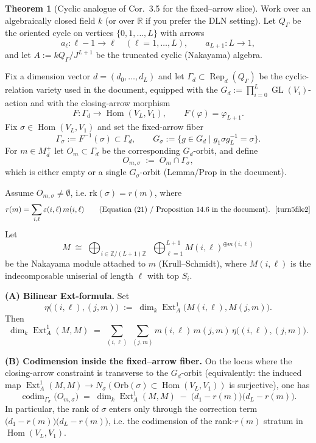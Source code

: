 \documentclass{article}
\newcommand{\Hom}{\operatorname{Hom}}
\newcommand{\Rep}{\operatorname{Rep}}
\newcommand{\codim}{\operatorname{codim}}
\newcommand{\Ext}{\operatorname{Ext}}
\newcommand{\GL}{\operatorname{GL}}
\theoremstyle{definition}
\newtheorem{theorem}{Theorem}[section]
\begin{document}
\begin{theorem}[Cyclic analogue of Cor.~3.5 for the fixed--arrow slice]\label{thm:cyclic_cor35}
Work over an algebraically closed field $k$ (or over $\mathbb{R}$ if you prefer the DLN setting).
Let $Q_\Gamma$ be the oriented cycle on vertices $\{0,1,\dots,L\}$ with arrows
\[
a_\ell:\ell-1\to \ell\quad (\ell=1,\dots,L),\qquad a_{L+1}:L\to 1,
\]
and let $A:=kQ_\Gamma/J^{L+1}$ be the truncated cyclic (Nakayama) algebra.

Fix a dimension vector $d=(d_0,\dots,d_L)$ and let $\Gamma_d\subset \Rep_d(Q_\Gamma)$ be the cyclic-relation variety
used in the document, equipped with the $G_d:=\prod_{i=0}^L\GL(V_i)$-action and with the closing-arrow morphism
\[
F:\Gamma_d\to \Hom(V_L,V_1),\qquad F(\varphi)=\varphi_{L+1}.
\]
Fix $\sigma\in\Hom(V_L,V_1)$ and set the fixed-arrow fiber
\[
\Gamma_\sigma:=F^{-1}(\sigma)\subset \Gamma_d,\qquad
G_\sigma:=\{g\in G_d\mid g_1\sigma g_L^{-1}=\sigma\}.
\]
For $m\in M_d^+$ let $O_m\subset \Gamma_d$ be the corresponding $G_d$-orbit, and define
\[
O_{m,\sigma}\;:=\;O_m\cap \Gamma_\sigma,
\]
which is either empty or a single $G_\sigma$-orbit (Lemma/Prop in the document). \ \ \textup{\cite{turn5file15}}

Assume $O_{m,\sigma}\neq \emptyset$, i.e. $\text{rk}(\sigma)=r(m)$, where
\[
r(m)=\sum_{i,\ell}\varepsilon(i,\ell)\,m(i,\ell)
\qquad\text{(Equation (21) / Proposition~14.6 in the document).}\ \ \textup{\cite{turn5file2}}
\]
Let
\[
M \;\cong\;\bigoplus_{i\in \mathbb{Z}/(L+1)\mathbb{Z}}\ \ \bigoplus_{\ell=1}^{L+1} M(i,\ell)^{\oplus m(i,\ell)}
\]
be the Nakayama module attached to $m$ (Krull--Schmidt), where $M(i,\ell)$ is the indecomposable uniserial of length $\ell$
with top $S_i$.

\medskip
\noindent
\textbf{(A) Bilinear Ext-formula.}
Set
\[
\eta\big((i,\ell),(j,m)\big)\;:=\;\dim_k\Ext_A^1\!\big(M(i,\ell),M(j,m)\big).
\]
Then
\[
\dim_k\Ext_A^1(M,M)\;=\;\sum_{(i,\ell)}\ \sum_{(j,m)} m(i,\ell)\,m(j,m)\,\eta\big((i,\ell),(j,m)\big).
\]

\medskip
\noindent
\textbf{(B) Codimension inside the fixed--arrow fiber.}
On the locus where the closing-arrow constraint is transverse to the $G_d$-orbit (equivalently: the induced map
$\Ext_A^1(M,M)\to N_\sigma(\mathrm{Orb}(\sigma)\subset \Hom(V_L,V_1))$ is surjective), one has
\begin{equation}\label{eq:codim_fixed_arrow}
\codim_{\Gamma_\sigma}\!\big(O_{m,\sigma}\big)
\;=\;
\dim_k\Ext_A^1(M,M)\;-\;\bigl(d_1-r(m)\bigr)\bigl(d_L-r(m)\bigr).
\end{equation}
In particular, the rank of $\sigma$ enters only through the correction term
$\bigl(d_1-r(m)\bigr)\bigl(d_L-r(m)\bigr)$, i.e. the codimension of the rank-$r(m)$ stratum in $\Hom(V_L,V_1)$.

\end{theorem}
\end{document}
